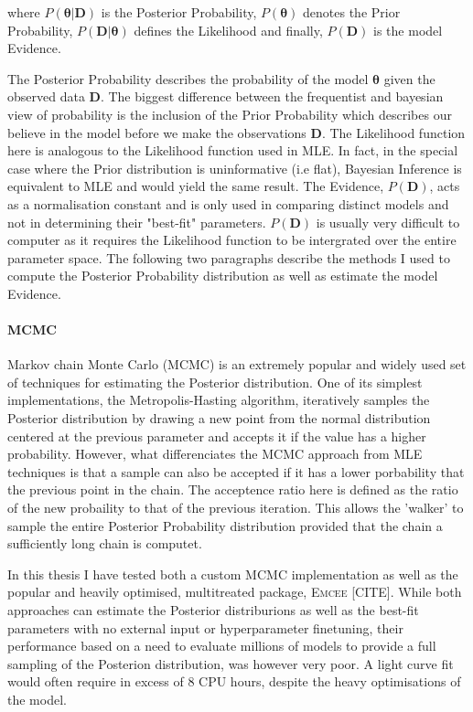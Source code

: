 \noindent where $P(\mathbf{\theta}|\mathbf{D})$ is the Posterior Probability, $P(\mathbf{\theta})$ denotes the Prior Probability, $P(\mathbf{D}|\mathbf{\theta})$ defines the Likelihood and finally, $P(\mathbf{D})$ is the model Evidence.

The Posterior Probability describes the probability of the model $\mathbf{\theta}$ given the observed data $\mathbf{D}$. The biggest difference between the frequentist and bayesian view of probability is the inclusion of the Prior Probability which describes our believe in the model before we make the observations $\textbf{D}$. The Likelihood function here is analogous to the Likelihood function used in MLE. In fact, in the special case where the Prior distribution is uninformative (i.e flat), Bayesian Inference is equivalent to MLE and would yield the same result. The Evidence, $P(\mathbf{D})$, acts as a normalisation constant and is only used in comparing distinct models and not in determining their "best-fit" parameters. $P(\mathbf{D})$ is usually very difficult to computer as it requires the Likelihood function to be intergrated over the entire parameter space. The following two paragraphs describe the methods I used to compute the Posterior Probability distribution as well as estimate the model Evidence.

\paragraph{MCMC}
Markov chain Monte Carlo (MCMC) is an extremely popular and widely used set of techniques for estimating the Posterior distribution. One of its simplest implementations, the Metropolis-Hasting algorithm, iteratively samples the Posterior distribution by drawing a new point from the normal distribution centered at the previous parameter and accepts it if the value has a higher probability. However, what differenciates the MCMC approach from MLE techniques is that a sample can also be accepted if it has a lower porbability that the previous point in the chain. The acceptence ratio here is defined as the ratio of the new probaility to that of the previous iteration. This allows the 'walker' to sample the entire Posterior Probability distribution provided that the chain a sufficiently long chain is computet.

In this thesis I have tested both a custom MCMC implementation as well as the popular and heavily optimised, multitreated package, \textsc{Emcee} [CITE]. While both approaches can estimate the Posterior distriburions as well as the best-fit parameters with no external input or hyperparameter finetuning, their performance based on a need to evaluate millions of models to provide a full sampling of the Posterion distribution, was however very poor. A light curve fit would often require in excess of 8 CPU hours, despite the heavy optimisations of the model.

